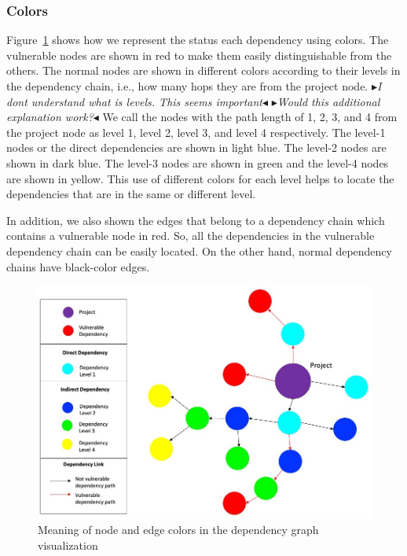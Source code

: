 \documentclass[conference]{IEEEtran}
\newcommand{\boxedtext}[1]{\fbox{\scriptsize\bfseries\textsf{#1}}}
\newcommand{\nota}[2]{
	\boxedtext{#1}
	{\small$\blacktriangleright$\emph{\textsl{#2}}$\blacktriangleleft$}
}
\newcommand{\todo}[1]{{\color{red}\nota{TODO}{#1}}}
\begin{document}
	\subsubsection{Colors}
	Figure~\ref{fig:viz-concept} shows how we represent the status each dependency using colors.
	The vulnerable nodes are shown in red to make them easily distinguishable from the others. The normal nodes are shown in different colors according to their levels in the dependency chain, i.e., how many hops they are from the project node. 
	\todo{I dont understand what is levels. This seems important} \todo{Would this additional explanation work?}
	We call the nodes with the path length of 1, 2, 3, and 4 from the project node as level 1, level 2, level 3, and level 4 respectively. The level-1 nodes or the direct dependencies are shown in light blue. The level-2 nodes are shown in dark blue. The level-3 nodes are shown in green and the level-4 nodes are shown in yellow. This use of different colors for each level helps to locate the dependencies that are in the same or different level.
	
	In addition, we also shown the edges that belong to a dependency chain which contains a vulnerable node in red. So, all the dependencies in the vulnerable dependency chain can be easily located. On the other hand, normal dependency chains have black-color edges.
	
	\begin{figure}[tb]
		\centering
		\includegraphics[width=\columnwidth]{Figures/Viz-concept-1.jpg}
		\caption{Meaning of node and edge colors in the dependency graph visualization}
		\label{fig:viz-concept}
	\end{figure}
\end{document}
